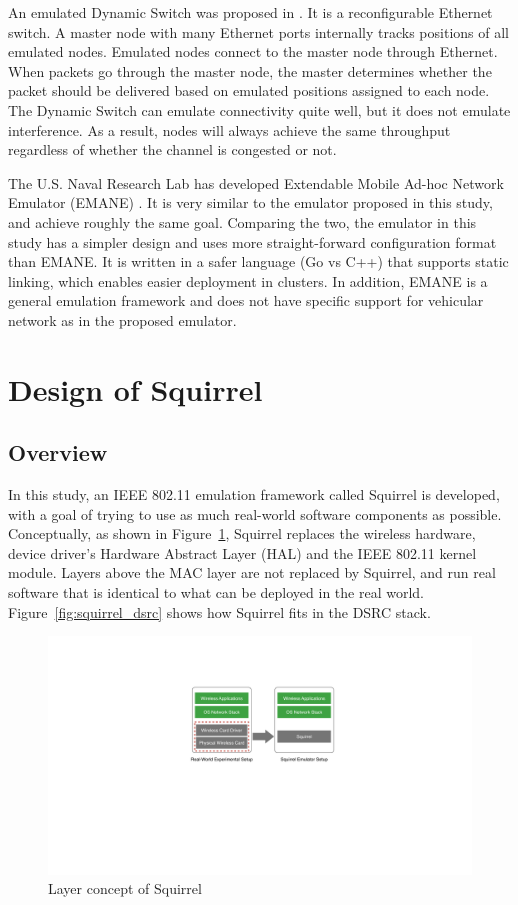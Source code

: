 \documentclass[12pt]{report}
\begin{document}
An emulated Dynamic Switch was proposed in \cite{lin2004mobile}. It is a reconfigurable Ethernet switch. A master node with many Ethernet ports internally tracks positions of all emulated nodes. Emulated nodes connect to the master node through Ethernet. When packets go through the master node, the master determines whether the packet should be delivered based on emulated positions assigned to each node. The Dynamic Switch can emulate connectivity quite well, but it does not emulate interference. As a result, nodes will always achieve the same throughput regardless of whether the channel is congested or not.

The U.S. Naval Research Lab has developed Extendable Mobile Ad-hoc Network Emulator (EMANE) \cite{EMANE}. It is very similar to the emulator proposed in this study, and achieve roughly the same goal. Comparing the two, the emulator in this study has a simpler design and uses more straight-forward configuration format than EMANE. It is written in a safer language (Go vs C++) that supports static linking, which enables easier deployment in clusters. In addition, EMANE is a general emulation framework and does not have specific support for vehicular network as in the proposed emulator.

\section{Design of Squirrel}
\subsection{Overview}

In this study, an IEEE 802.11 emulation framework called Squirrel is developed, with a goal of trying to use as much real-world software components as possible. Conceptually, as shown in Figure~\ref{fig:squirrel_concept}, Squirrel replaces the wireless hardware, device driver's Hardware Abstract Layer (HAL) and the IEEE 802.11 kernel module. Layers above the MAC layer are not replaced by Squirrel, and run real software that is identical to what can be deployed in the real world. Figure~\ref{fig:squirrel_dsrc} shows how Squirrel fits in the DSRC stack.

\begin{figure}[h]
  \begin{center}
    \includegraphics[width=.7\textwidth]{figures/squirrelConcept.pdf}
    \caption{\label{fig:squirrel_concept}Layer concept of Squirrel}
  \end{center}
\end{figure}
\end{document}
